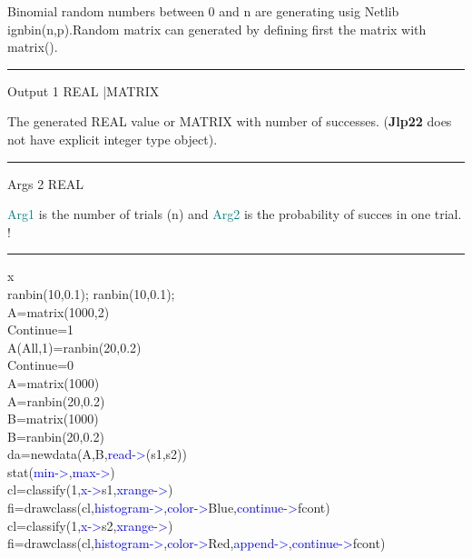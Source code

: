 Binomial random numbers between 0 and n are generating usig Netlib
ignbin(n,p).Random matrix can generated by defining first
the matrix with \textcolor{VioletRed}{matrix}().
\vspace{0.3cm}
\hrule
\vspace{0.3cm}
\noindent Output \tabto{3cm}  1 \tabto{5cm}   REAL |MATRIX   \tabto{7cm}
\begin{changemargin}{3cm}{0cm}
\noindent  The generated REAL value or MATRIX with
number of successes. (\textbf{Jlp22} does not have explicit integer type object).
\end{changemargin}
\vspace{0.3cm}
\hrule
\vspace{0.3cm}
\noindent Args  \tabto{3cm} 2 \tabto{5cm}  REAL \tabto{7cm}
\begin{changemargin}{3cm}{0cm}
\noindent  \textcolor{teal}{Arg1} is the number of trials (n) and \textcolor{teal}{Arg2} is the probability
of succes in one trial.
	!
\end {changemargin}
\hrule
\vspace{0.2cm}
\begin{example}[ranbinex]x\\
\label{ranbinex}
\textcolor{VioletRed}{ranbin}(10,0.1);
\textcolor{VioletRed}{ranbin}(10,0.1);\\
A=\textcolor{VioletRed}{matrix}(1000,2)\\
Continue=1\\
A(All,1)=\textcolor{VioletRed}{ranbin}(20,0.2)\\
Continue=0\\
A=\textcolor{VioletRed}{matrix}(1000)\\
A=\textcolor{VioletRed}{ranbin}(20,0.2)\\
B=\textcolor{VioletRed}{matrix}(1000)\\
B=\textcolor{VioletRed}{ranbin}(20,0.2)\\
da=\textcolor{VioletRed}{newdata}(A,B,\textcolor{blue}{read->}(s1,s2))\\
\textcolor{VioletRed}{stat}(\textcolor{blue}{min->},\textcolor{blue}{max->})\\
cl=\textcolor{VioletRed}{classify}(1,\textcolor{blue}{x->}s1,\textcolor{blue}{xrange->})\\
fi=\textcolor{VioletRed}{drawclass}(cl,\textcolor{blue}{histogram->},\textcolor{blue}{color->}Blue,\textcolor{blue}{continue->}fcont)\\
cl=\textcolor{VioletRed}{classify}(1,\textcolor{blue}{x->}s2,\textcolor{blue}{xrange->})\\
fi=\textcolor{VioletRed}{drawclass}(cl,\textcolor{blue}{histogram->},\textcolor{blue}{color->}Red,\textcolor{blue}{append->},\textcolor{blue}{continue->}fcont)
\end{example}

